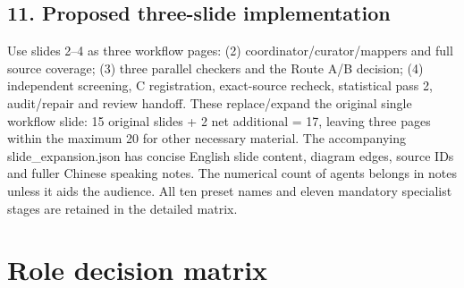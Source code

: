 \documentclass[10pt,a4paper]{article}
\begin{document}
\subsection*{11.\allowbreak{} Proposed three-\allowbreak{}slide implementation}
Use slides 2–4 as three workflow pages: (2) coordinator/\allowbreak{}curator/\allowbreak{}mappers and full source coverage; (3) three parallel checkers and the Route A/\allowbreak{}B decision; (4) independent screening, C registration, exact-\allowbreak{}source recheck, statistical pass 2, audit/\allowbreak{}repair and review handoff.\allowbreak{} These replace/\allowbreak{}expand the original single workflow slide: 15 original slides + 2 net additional = 17, leaving three pages within the maximum 20 for other necessary material.\allowbreak{} The accompanying slide\_\allowbreak{}expansion.\allowbreak{}json has concise English slide content, diagram edges, source IDs and fuller Chinese speaking notes.\allowbreak{} The numerical count of agents belongs in notes unless it aids the audience.\allowbreak{} All ten preset names and eleven mandatory specialist stages are retained in the detailed matrix.\allowbreak{}\par
\clearpage\section{Role decision matrix}
\end{document}
